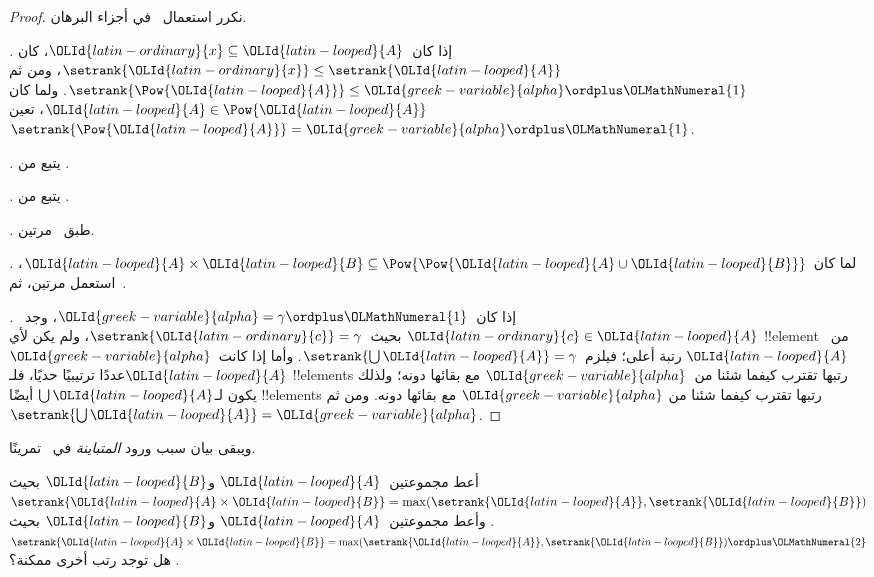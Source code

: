 \documentclass[../../../include/open-logic-section]{subfiles}
\begin{document}
\begin{proof}
نكرر استعمال~ في أجزاء البرهان.

\emph{.} إذا كان~$\OLId{latin-ordinary}{x} \subseteq \OLId{latin-looped}{A}$، كان
$\setrank{\OLId{latin-ordinary}{x}} \leq \setrank{\OLId{latin-looped}{A}}$، ومن ثم
$\setrank{\Pow{\OLId{latin-looped}{A}}} \leq \OLId{greek-variable}{alpha} \ordplus \OLMathNumeral{1}$. ولما كان
$\OLId{latin-looped}{A} \in \Pow{\OLId{latin-looped}{A}}$، تعين~$\setrank{\Pow{\OLId{latin-looped}{A}}} = \OLId{greek-variable}{alpha} \ordplus \OLMathNumeral{1}$.

\emph{.} يتبع من
.

\emph{.} يتبع من
.

\emph{.} طبق~ مرتين.

\emph{.} لما كان
$\OLId{latin-looped}{A} \times \OLId{latin-looped}{B} \subseteq \Pow{\Pow{\OLId{latin-looped}{A} \cup \OLId{latin-looped}{B}}}$، استعمل
 مرتين، ثم~.

\emph{.} إذا كان~$\OLId{greek-variable}{alpha} = \gamma\ordplus \OLMathNumeral{1}$،
وجد~$\OLId{latin-ordinary}{c} \in \OLId{latin-looped}{A}$ بحيث~$\setrank{\OLId{latin-ordinary}{c}} = \gamma$، ولم يكن لأي
!!{element} من~$\OLId{latin-looped}{A}$ رتبة أعلى؛ فيلزم~$\setrank{\bigcup \OLId{latin-looped}{A}} = \gamma$.
وأما إذا كانت~$\OLId{greek-variable}{alpha}$ عددًا ترتيبيًا حديًا، فلـ$\OLId{latin-looped}{A}$ !!{element}s
رتبها تقترب كيفما شئنا من~$\OLId{greek-variable}{alpha}$ مع بقائها دونه؛ ولذلك يكون
لـ$\bigcup \OLId{latin-looped}{A}$ أيضًا !!{element}s رتبها تقترب كيفما شئنا من
$\OLId{greek-variable}{alpha}$ مع بقائها دونه. ومن ثم~$\setrank{\bigcup \OLId{latin-looped}{A}} = \OLId{greek-variable}{alpha}$.
\end{proof}
\noindent
ويبقى بيان سبب ورود \emph{المتباينة} في~ تمرينًا.

\begin{prob}
أعط مجموعتين~$\OLId{latin-looped}{A}$ و$\OLId{latin-looped}{B}$ بحيث
$\setrank{\OLId{latin-looped}{A} \times \OLId{latin-looped}{B}} =
\max(\setrank{\OLId{latin-looped}{A}}, \setrank{\OLId{latin-looped}{B}})$. وأعط مجموعتين~$\OLId{latin-looped}{A}$ و$\OLId{latin-looped}{B}$ بحيث
$\setrank{\OLId{latin-looped}{A} \times \OLId{latin-looped}{B}} =
\max(\setrank{\OLId{latin-looped}{A}}, \setrank{\OLId{latin-looped}{B}}) \ordplus \OLMathNumeral{2}$. هل توجد رتب أخرى ممكنة؟
\end{prob}
\end{document}
